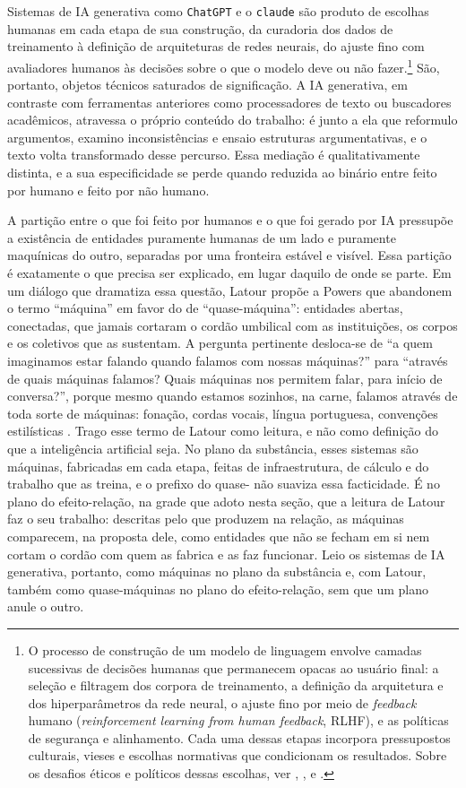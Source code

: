 Sistemas de IA generativa como \texttt{ChatGPT} e o \texttt{claude} são produto de escolhas humanas em cada etapa de sua construção, da curadoria dos dados de treinamento à definição de arquiteturas de redes neurais, do ajuste fino com avaliadores humanos às decisões sobre o que o modelo deve ou não fazer.\footnote{O processo de construção de um modelo de linguagem envolve camadas sucessivas de decisões humanas que permanecem opacas ao usuário final: a seleção e filtragem dos corpora de treinamento, a definição da arquitetura e dos hiperparâmetros da rede neural, o ajuste fino por meio de \textit{feedback} humano (\textit{reinforcement learning from human feedback}, RLHF), e as políticas de segurança e alinhamento. Cada uma dessas etapas incorpora pressupostos culturais, vieses e escolhas normativas que condicionam os resultados. Sobre os desafios éticos e políticos dessas escolhas, ver \textcite{Buolamwini2023Unmasking}, \textcite{Noble2018Algorithms}, \textcite{Benjamin2019RaceAfter} e \textcite{Christian2020Alignment}.} São, portanto, objetos técnicos saturados de significação. A IA generativa, em contraste com ferramentas anteriores como processadores de texto ou buscadores acadêmicos, atravessa o próprio conteúdo do trabalho: é junto a ela que reformulo argumentos, examino inconsistências e ensaio estruturas argumentativas, e o texto volta transformado desse percurso. Essa mediação é qualitativamente distinta, e a sua especificidade se perde quando reduzida ao binário entre feito por humano e feito por não humano.

A partição entre o que foi feito por humanos e o que foi gerado por IA pressupõe a existência de entidades puramente humanas de um lado e puramente maquínicas do outro, separadas por uma fronteira estável e visível. Essa partição é exatamente o que precisa ser explicado, em lugar daquilo de onde se parte.
Em um diálogo que dramatiza essa questão, Latour propõe a Powers que abandonem o termo \enquote{máquina} em favor do de \enquote{quase-máquina}: entidades abertas, conectadas, que jamais cortaram o cordão umbilical com as instituições, os corpos e os coletivos que as sustentam. A pergunta pertinente desloca-se de \enquote{a quem imaginamos estar falando quando falamos com nossas máquinas?} para \enquote{através de quais máquinas falamos? Quais máquinas nos permitem falar, para início de conversa?}, porque mesmo quando estamos sozinhos, na carne, falamos através de toda sorte de máquinas: fonação, cordas vocais, língua portuguesa, convenções estilísticas \parencite{Latour2008Powers}. Trago esse termo de Latour como leitura, e não como definição do que a inteligência artificial seja. No plano da substância, esses sistemas são máquinas, fabricadas em cada etapa, feitas de infraestrutura, de cálculo e do trabalho que as treina, e o prefixo do quase- não suaviza essa facticidade. É no plano do efeito-relação, na grade que adoto nesta seção, que a leitura de Latour faz o seu trabalho: descritas pelo que produzem na relação, as máquinas comparecem, na proposta dele, como entidades que não se fecham em si nem cortam o cordão com quem as fabrica e as faz funcionar. Leio os sistemas de IA generativa, portanto, como máquinas no plano da substância e, com Latour, também como quase-máquinas no plano do efeito-relação, sem que um plano anule o outro.

